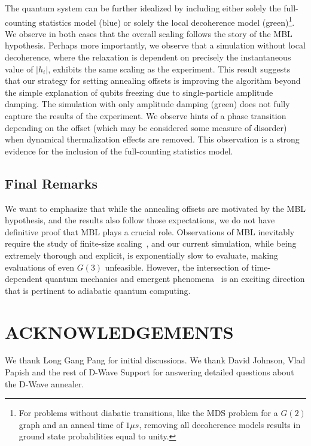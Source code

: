 \documentclass[10pt]{iopart}
\begin{document}
The quantum system can be further idealized by including either solely the full-counting statistics model (blue) or solely the local decoherence model (green)\footnote{For problems without diabatic transitions, like the MDS problem for a $G(2)$ graph and an anneal time of $1\mu s$, removing all decoherence models results in ground state probabilities equal to unity.}. We observe in both cases that the overall scaling follows the story of the MBL hypothesis. Perhaps more importantly, we observe that a simulation without local decoherence, where the relaxation is dependent on precisely the instantaneous value of $|h_i|$, exhibits the same scaling as the experiment. This result suggests that our strategy for setting annealing offsets is improving the algorithm beyond the simple explanation of qubits freezing due to single-particle amplitude damping. The simulation with only amplitude damping (green) does not fully capture the results of the experiment. We observe hints of a phase transition depending on the offset (which may be considered some measure of disorder) when dynamical thermalization effects are removed. This observation is a strong evidence for the inclusion of the full-counting statistics model.

\subsection{Final Remarks}
\label{sec:results:final}
We want to emphasize that while the annealing offsets are motivated by the MBL hypothesis, and the results also follow those expectations, we do not have definitive proof that MBL plays a crucial role.
Observations of MBL inevitably require the study of finite-size scaling~\cite{2015PhRvB..91h1103L}, and our current simulation, while being extremely thorough and explicit, is exponentially slow to evaluate, making evaluations of even $G(3)$ unfeasible.
However, the intersection of time-dependent quantum mechanics and emergent phenomena~\cite{Goldenfeld:1992qy} is an exciting direction that is pertinent to adiabatic quantum computing.

\section{ACKNOWLEDGEMENTS}

We thank Long Gang Pang for initial discussions.
We thank David Johnson, Vlad Papish and the rest of D-Wave Support for answering detailed questions about the D-Wave annealer.
\end{document}
